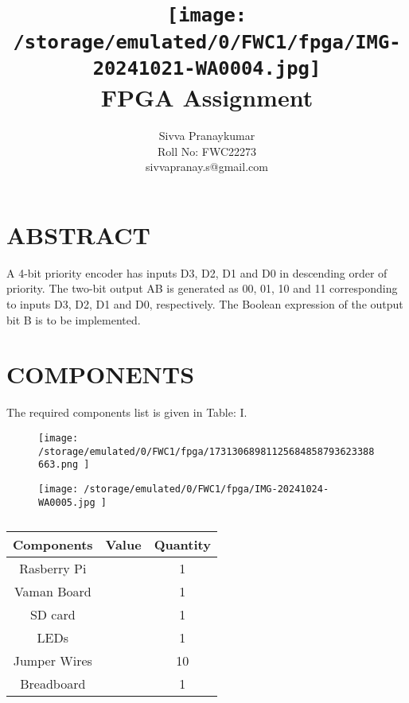 \documentclass[conference]{IEEEtran}
\title{
\vspace{1cm}
{\texttt{[image:  /storage/emulated/0/FWC1/fpga/IMG-20241021-WA0004.jpg]} \\ FPGA Assignment} }
\author{Sivva Pranaykumar\\ Roll No: FWC22273\\ sivvapranay.s@gmail.com}
\begin{document}
\maketitle
 \section {ABSTRACT}
A 4-bit priority encoder has inputs D3, D2, D1 and D0 in descending order of priority. The two-bit output AB is generated as 00, 01, 10 and 11 corresponding to inputs D3, D2, D1 and D0, respectively. The Boolean expression of the output bit B is to be implemented.
\section{COMPONENTS}
The required components list is given in Table: I. 

\begin{figure}[h]
\centering
\texttt{[image: /storage/emulated/0/FWC1/fpga/17313068981125684858793623388663.png         ]}    
\end{figure}

 \begin {figure} [h]
 \centering
 \texttt{[image: /storage/emulated/0/FWC1/fpga/IMG-20241024-WA0005.jpg        ]}
 \end {figure}

\begin{table} [htbp]
\centering
\begin{tabular}{| c | c | c |} \hline
Components & Value & Quantity \\\hline
Rasberry Pi &  & 1 \\\hline
Vaman Board&  & 1 \\\hline
SD card&  & 1 \\\hline
LEDs &  & 1 \\ \hline
Jumper Wires &  & 10 \\ \hline
Breadboard & & 1 \\ 
\hline
\end{tabular}
\vspace{0.1cm}
\caption{\label{tab:widgets}}
\end{table}
\end{document}
